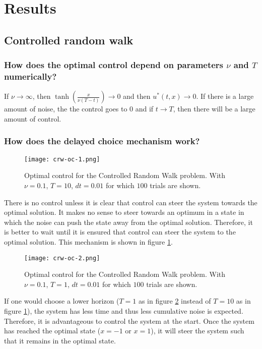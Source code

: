 \documentclass[10pt,a4paper]{article}
\begin{document}
\section{Results}
\subsection{Controlled random walk}
\subsubsection{How does the optimal control depend on parameters $\nu$ and $T$ numerically?}
If $\nu \rightarrow \infty$, then $\tanh(\frac{x}{\nu (T - t)}) \rightarrow 0$ and then $u^{*}(t,x) \rightarrow 0$. If there is a large amount of noise, the the control goes to $0$ and if $t \rightarrow T$, then there will be a large amount of control.

\subsubsection{How does the delayed choice mechanism work?}

\begin{figure}
\centering
\texttt{[image: crw-oc-1.png]}
\caption{Optimal control for the Controlled Random Walk problem. With $\nu=0.1$, $T=10$, $dt=0.01$ for which $100$ trials are shown.}
\label{fig:crw-oc-1}
\end{figure}

There is no control unless it is clear that control can steer the system towards the optimal solution. It makes no sense to steer towards an optimum in a state in which the noise can push the state away from the optimal solution. Therefore, it is better to wait until it is ensured that control can steer the system to the optimal solution. This mechanism is shown in figure \ref{fig:crw-oc-1}.

\begin{figure}
\centering
\texttt{[image: crw-oc-2.png]}
\caption{Optimal control for the Controlled Random Walk problem. With $\nu=0.1$, $T=1$, $dt=0.01$ for which $100$ trials are shown.}
\label{fig:crw-oc-2}
\end{figure}

If one would choose a lower horizon ($T = 1$ as in figure \ref{fig:crw-oc-2} instead of $T = 10$ as in figure \ref{fig:crw-oc-1}), the system has less time and thus less cumulative noise is expected. Therefore, it is advantageous to control the system at the start. Once the system has reached the optimal state ($x = -1$ or $x = 1$), it will steer the system such that it remains in the optimal state.
\end{document}
